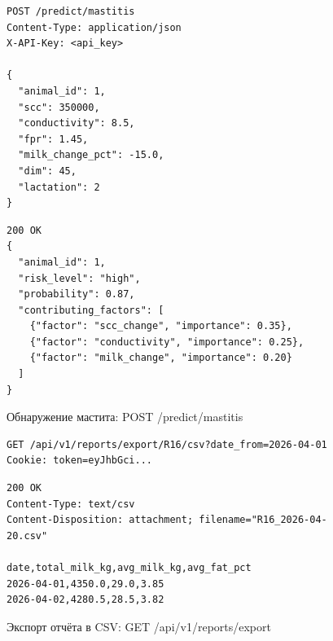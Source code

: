 \begin{figure}
  \begin{lstlisting}[basicstyle=\small\ttfamily]
POST /predict/mastitis
Content-Type: application/json
X-API-Key: <api_key>

{
  "animal_id": 1,
  "scc": 350000,
  "conductivity": 8.5,
  "fpr": 1.45,
  "milk_change_pct": -15.0,
  "dim": 45,
  "lactation": 2
}
\end{lstlisting}
\vspace{0.5em}
\begin{lstlisting}[basicstyle=\small\ttfamily]
200 OK
{
  "animal_id": 1,
  "risk_level": "high",
  "probability": 0.87,
  "contributing_factors": [
    {"factor": "scc_change", "importance": 0.35},
    {"factor": "conductivity", "importance": 0.25},
    {"factor": "milk_change", "importance": 0.20}
  ]
}
\end{lstlisting}
  \caption{Обнаружение мастита: POST /predict/mastitis}
  \label{api-mastitis}
\end{figure}

\begin{figure}
  \begin{lstlisting}[basicstyle=\small\ttfamily]
GET /api/v1/reports/export/R16/csv?date_from=2026-04-01
Cookie: token=eyJhbGci...
\end{lstlisting}
\vspace{0.5em}
\begin{lstlisting}[basicstyle=\small\ttfamily]
200 OK
Content-Type: text/csv
Content-Disposition: attachment; filename="R16_2026-04-20.csv"

date,total_milk_kg,avg_milk_kg,avg_fat_pct
2026-04-01,4350.0,29.0,3.85
2026-04-02,4280.5,28.5,3.82
\end{lstlisting}
  \caption{Экспорт отчёта в CSV: GET /api/v1/reports/export}
  \label{api-export}
\end{figure}
